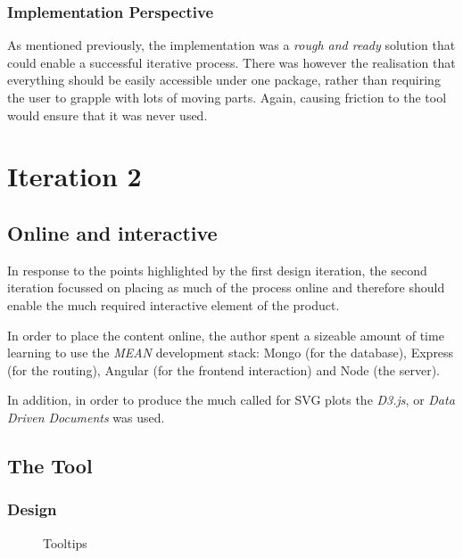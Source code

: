 \documentclass[a4paper,11pt,titlepage]{article}
\begin{document}
		\subsubsection{Implementation Perspective}	
		As mentioned previously, the implementation was a \textit{rough and ready} solution that could enable a successful iterative process. There was however the realisation that everything should be easily accessible under one package, rather than requiring the user to grapple with lots of moving parts. Again, causing friction to the tool would ensure that it was never used.
		
\clearpage 

\section{Iteration 2}
	\subsection{Online and interactive}
	In response to the points highlighted by the first design iteration, the second iteration focussed on placing as much of the process online and therefore should enable the much required interactive element of the product. 
	\par 
	In order to place the content online, the author spent a sizeable amount of time learning to use the \textit{MEAN} development stack: Mongo (for the database), Express (for the routing), Angular (for the frontend interaction) and Node (the server). 
	\par 
	In addition, in order to produce the much called for SVG plots the \textit{D3.js}, or \textit{Data Driven Documents} was used. 
	
	\subsection{The Tool}
		\subsubsection{Design}
			
	
	\begin{figure}[H]
    			\caption{Tooltips}%
	\end{figure}		
	
\end{document}
